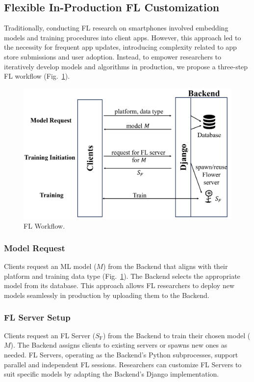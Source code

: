 \documentclass[letterpaper]{article} %
\begin{document}
\subsection{Flexible In-Production FL Customization}
\newcommand{\model}{$M$}
\newcommand{\fs}{$S_\mathrm F$}
Traditionally, conducting FL research on smartphones involved
embedding models and training procedures into client apps.
However, this approach led to the necessity for frequent app updates,
introducing complexity related to app store submissions and user adoption.
Instead,
to empower researchers to iteratively develop models and algorithms
in production, we propose a three-step FL workflow
(Fig.~\ref{fig:fl-workflow}).
\begin{figure}
    \centering
    \includegraphics*[width=\linewidth]{fl_workflow.pdf}
    \caption{FL Workflow.}
    \label{fig:fl-workflow}
\end{figure}

\subsubsection{Model Request}
Clients request an ML model (\model{}) from the Backend that
aligns with their platform and training data type
(Fig.~\ref{fig:fl-workflow}).
The Backend selects the appropriate model from its database.
This approach allows FL researchers to deploy new models seamlessly
in production by uploading them to the Backend.

\subsubsection{FL Server Setup}
Clients request an FL Server (\fs{}) from the Backend to
train their chosen model (\model{}).
The Backend assigns clients to existing servers or spawns new ones as needed.
FL Servers, operating as the Backend's Python subprocesses,
support parallel and independent FL sessions.
Researchers can customize FL Servers to suit specific models by
adapting the Backend's Django implementation.
\end{document}
